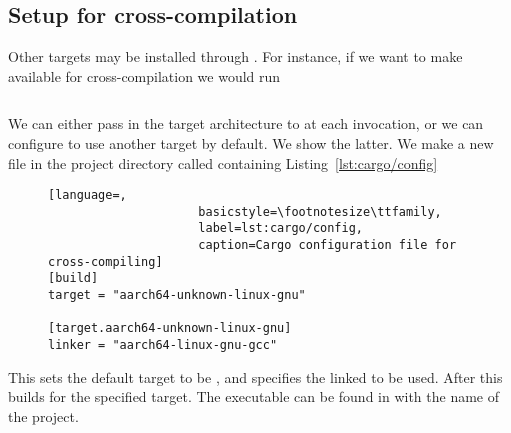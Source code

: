 \documentclass[b5paper]{report}
\begin{document}
\begin{appendices}
  \section{Setup for cross-compilation}
  Other targets may be installed through \rustup{}. For instance, if we want to
  make  available for cross-compilation we would run
  \begin{lstlisting}[language=Bash,numbers=none]
% rustup target add aarch64-unknown-linux-gnu
  \end{lstlisting}
  We can either pass in the target architecture to \cargo{} at each invocation,
  or we can configure \cargo{} to use another target by default. We show the latter.
  We make a new file in the project directory called 
  containing Listing~\ref{lst:cargo/config}
  \begin{figure}[ht]
  \begin{lstlisting}[language=,
                     basicstyle=\footnotesize\ttfamily,
                     label=lst:cargo/config,
                     caption=Cargo configuration file for cross-compiling]
[build]
target = "aarch64-unknown-linux-gnu"

[target.aarch64-unknown-linux-gnu]
linker = "aarch64-linux-gnu-gcc"
  \end{lstlisting}
  \end{figure}
  This sets the default target to be ,
  and specifies the linked to be used.
  After this  builds for the specified target.
  The executable can be found in 
  with the name of the project.




\end{appendices}



\end{document}
